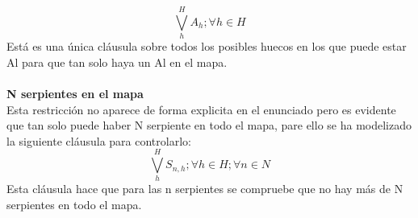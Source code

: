\documentclass[11pt,spanish]{article}
\begin{document}
			\begin{equation*}
				\bigvee\limits_{h}^H A_h; \forall h \in H
			\end{equation*}
			Está es una única cláusula sobre todos los posibles huecos en los que puede estar Al para que tan solo haya un Al en el mapa.
			\\
			\\
			\textbf{N serpientes en el mapa}\\
			Esta restricción no aparece de forma explicita en el enunciado pero es evidente que tan solo puede haber N serpiente en todo el mapa, pare ello se ha modelizado la siguiente cláusula para controlarlo:
			\begin{equation*}
				\bigvee\limits_{h}^H S_{n,h} ;\forall h \in H;\forall n \in N
			\end{equation*}
			Esta cláusula hace que para las n serpientes se compruebe que no hay más de N serpientes en todo el mapa.
		
\end{document}
